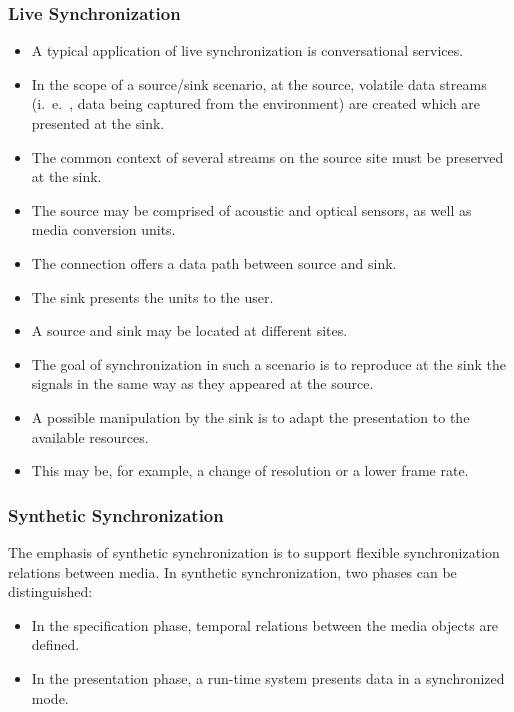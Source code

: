 \subsubsection*{Live Synchronization}
\begin{multicols}{2}
	\begin{itemize}
		\item A typical application of live synchronization is conversational services. 
		\item In the scope of a source/sink scenario, at the source, volatile data streams (i.\ e.\ , data being captured from the environment) are created which are presented at the sink. 
		\item The common context of several streams on the source site must be preserved at the sink. 
		\item The source may be comprised of acoustic and optical sensors, as well as media conversion units. 
		\item The connection offers a data path between source and sink. 
		\item The sink presents the units to the user. 
		\item A source and sink may be located at different sites.
		\item The goal of synchronization in such a scenario is to reproduce at the sink the signals in the same way as they appeared at the source. 
		\item A possible manipulation by the sink is to adapt the presentation to the available resources.
		\item  This may be, for example, a change of resolution or a lower frame rate.
	\end{itemize}
\end{multicols}

\subsubsection*{Synthetic Synchronization}
The emphasis of synthetic synchronization is to support flexible synchronization relations between media. In synthetic synchronization, two phases can be distinguished:
\begin{multicols}{2}

	\begin{itemize}
		\item In the specification phase, temporal relations between the media objects are defined.
		\item In the presentation phase, a run-time system presents data in a synchronized mode.
	\end{itemize}
	
	
\end{multicols}

